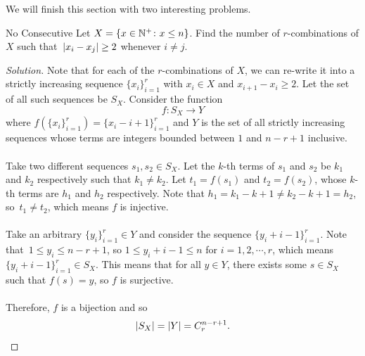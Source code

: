 \documentclass[math]{amznotes}
\newenvironment{solution}
    {\let\oldqedsymbol=\qedsymbol
    \renewcommand{\qedsymbol}{\ }
    \begin{proof}[Solution]
    }
    {\end{proof}
    \renewcommand{\qedsymbol}{\oldqedsymbol}
    }
\theoremstyle{remark}
\begin{document}
We will finish this section with two interesting problems.
\begin{exbox}{No Consecutive}{}
    Let $X = \left\{x \in \mathbb{N}^+ \colon x \leq n\right\}$. Find the number of $r$-combinations of $X$ such that~${\left\lvert {x_i - x_j} \right\rvert} \geq 2$ whenever $i \neq j$.
    \tcblower   
    \begin{solution}
        Note that for each of the $r$-combinations of $X$, we can re-write it into a strictly increasing sequence $\{x_i\}_{i = 1}^r$ with $x_i \in X$ and $x_{i + 1} - x_i \geq 2$. Let the set of all such sequences be $S_X$. Consider the function
        \begin{displaymath}
            f \colon S_X \to Y
        \end{displaymath}
        where $f\left(\{x_i\}_{i = 1}^r\right) = \{x_i - i + 1\}_{i = 1}^r$ and $Y$ is the set of all strictly increasing sequences whose terms are integers bounded between $1$ and $n - r + 1$ inclusive.
        \\\\
        Take two different sequences $s_1, s_2 \in S_X$. Let the $k$-th terms of $s_1$ and $s_2$ be $k_1$ and $k_2$ respectively such that $k_1 \neq k_2$. Let $t_1 = f(s_1)$ and $t_2 = f(s_2)$, whose $k$-th terms are $h_1$ and $h_2$ respectively. Note that $h_1 = k_1 - k + 1 \neq k_2 - k + 1 = h_2$, so~$t_1 \neq t_2$, which means $f$ is injective.
        \\\\
        Take an arbitrary $\{y_i\}_{i = 1}^r \in Y$ and consider the sequence $\{y_i + i - 1\}_{i = 1}^r$. Note that~$1 \leq y_i \leq n - r + 1$, so $1 \leq y_i + i - 1 \leq n$ for $i = 1, 2, \cdots, r$, which means~$\{y_i + i - 1\}_{i = 1}^r \in S_X$. This means that for all $y \in Y$, there exists some $s \in S_X$ such that $f(s) = y$, so $f$ is surjective.
        \\\\
        Therefore, $f$ is a bijection and so
        \begin{equation*}
            {\left\lvert {S_X} \right\rvert} = {\left\lvert {Y} \right\rvert} = C^{n - r + 1}_r.
        \end{equation*}
    \end{solution}
\end{exbox}
\end{document}
